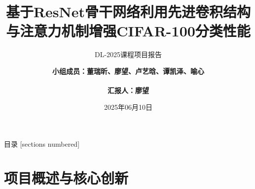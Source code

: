 \documentclass[10pt]{beamer}
\title{\bfseries 基于ResNet骨干网络利用先进卷积结构与注意力机制增强CIFAR-100分类性能}
\subtitle{DL-2025课程项目报告}
\date{2025年06月10日}
\author{\bf
小组成员：董瑞昕、廖望、卢艺晗、谭凯泽、喻心 \\\\ 汇报人：廖望
}
\institute{南开大学计算机学院}
\begin{document}
\maketitle

\begin{frame}{目录}
\hypersetup{linkcolor=black}
[sections numbered]
\tableofcontents
\end{frame}

\section{项目概述与核心创新}
\end{document}
